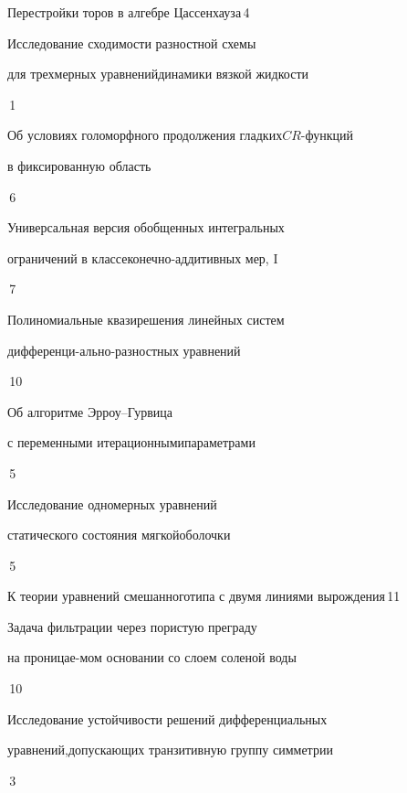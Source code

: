 {Перестройки торов в алгебре Цассенхауза}{\No\,4}


 {Исследование сходимости разностной схемы


для трехмерных уравнений\newline динамики вязкой жидкости}{\No\,1}




{Об условиях голоморфного продолжения гладких\newline $CR$-функций


в фиксированную область}{\No\,6}




{Универсальная версия обобщенных интегральных


ограничений в классе\newline конечно-аддитивных мер, I}{\No\,7}




{Полиномиальные квазирешения линейных систем


дифференци-\newline ально-разностных уравнений}{\No\,10}




{Об алгоритме Эрроу--Гурвица


с переменными итерационными\newline параметрами}{\No\,5}




{Исследование одномерных уравнений 


статического состояния мягкой\newline оболочки}{\No\,5}




{К теории уравнений смешанного\newline типа с двумя линиями вырождения}{\No\,11}




{Задача фильтрации через пористую преграду


на проницае-\newline мом основании со слоем соленой воды}{\No\,10}




{Исследование устойчивости решений дифференциальных


уравнений,\newline допускающих транзитивную группу симметрии}{\No\,3}


